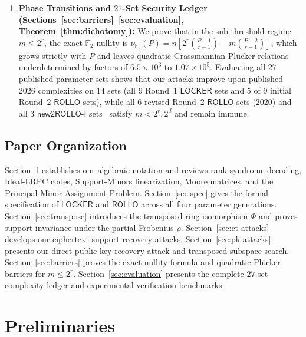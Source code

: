 \documentclass[11pt,a4paper]{article}
\theoremstyle{definition}
\theoremstyle{remark}
\newcommand{\Ftwo}{\mathbb{F}_2}
\begin{document}
\begin{enumerate}[leftmargin=1.8em,itemsep=2pt]
    \item \textbf{Phase Transitions and $27$-Set Security Ledger (Sections~\ref{sec:barriers}--\ref{sec:evaluation}, Theorem~\ref{thm:dichotomy}):} We prove that in the sub-threshold regime $m \le 2^r$, the exact $\Ftwo$-nullity is $\nu_{\Ftwo}(P) = n[2^r\binom{P-1}{r-1} - m\binom{P-2}{r-1}]$, which grows strictly with $P$ and leaves quadratic Grassmannian Pl\"{u}cker relations underdetermined by factors of $6.5 \times 10^3$ to $1.07 \times 10^5$. Evaluating all $27$ published parameter sets shows that our attacks improve upon published 2026 complexities on $14$ sets (all $9$ Round~1 $\mathsf{LOCKER}$ sets and $5$ of $9$ initial Round~2 $\mathsf{ROLLO}$ sets), while all $6$ revised Round~2 $\mathsf{ROLLO}$ sets (2020) and all $3$ $\mathsf{new2ROLLO\text{-}I}$ sets~\cite{BBC+20} satisfy $m < 2^r, 2^d$ and remain immune.
\end{enumerate}

\subsection{Paper Organization}
Section~\ref{sec:prelim} establishes our algebraic notation and reviews rank syndrome decoding, Ideal-LRPC codes, Support-Minors linearization, Moore matrices, and the Principal Minor Assignment Problem. Section~\ref{sec:spec} gives the formal specification of $\mathsf{LOCKER}$ and $\mathsf{ROLLO}$ across all four parameter generations. Section~\ref{sec:transpose} introduces the transposed ring isomorphism $\Phi$ and proves support invariance under the partial Frobenius $\rho$. Section~\ref{sec:ct-attacks} develops our ciphertext support-recovery attacks. Section~\ref{sec:pk-attacks} presents our direct public-key recovery attack and transposed subspace search. Section~\ref{sec:barriers} proves the exact nullity formula and quadratic Pl\"{u}cker barriers for $m \le 2^r$. Section~\ref{sec:evaluation} presents the complete $27$-set complexity ledger and experimental verification benchmarks.

\section{Preliminaries}
\label{sec:prelim}
\end{document}
